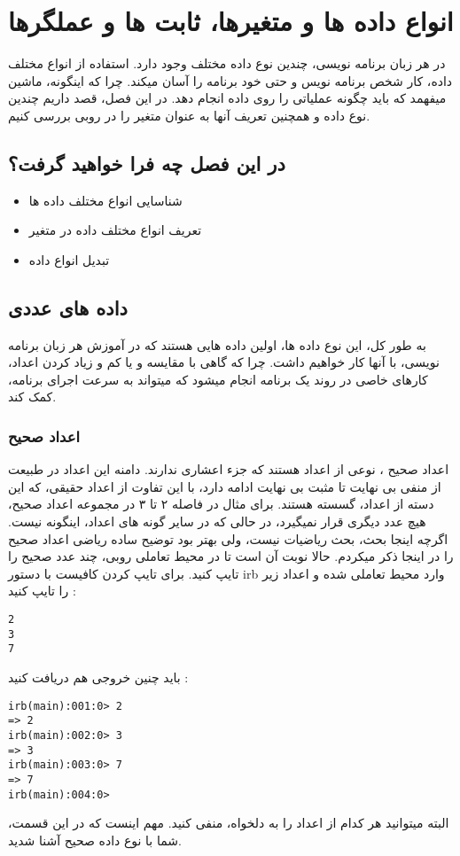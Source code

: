 \documentclass[11pt]{article}
\begin{document}
\section{انواع داده ها و متغیرها، ثابت ها و عملگرها}
در هر زبان برنامه نویسی، چندین نوع داده مختلف وجود دارد. استفاده از انواع مختلف داده، کار شخص برنامه نویس و حتی خود برنامه را آسان میکند. چرا که اینگونه، ماشین میفهمد که باید چگونه عملیاتی را روی داده انجام دهد. در این فصل، قصد داریم چندین نوع داده و همچنین تعریف آنها به عنوان متغیر را در روبی بررسی کنیم. 
\subsection{در این فصل چه فرا خواهید گرفت؟}
\begin{itemize}
\item شناسایی انواع مختلف داده ها
\item تعریف انواع مختلف داده در متغیر
\item تبدیل انواع داده
\end{itemize}
\subsection{داده های عددی}
به طور کل، این نوع داده ها، اولین داده هایی هستند که در آموزش هر زبان برنامه نویسی، با آنها کار خواهیم داشت. چرا که گاهی با مقایسه و یا کم و زیاد کردن اعداد، کارهای خاصی در روند یک برنامه انجام میشود که میتواند به سرعت اجرای برنامه، کمک کند. 
\subsubsection{اعداد صحیح}
اعداد صحیح
، نوعی از اعداد هستند که جزء اعشاری ندارند. دامنه این اعداد در طبیعت از منفی بی نهایت تا مثبت بی نهایت ادامه دارد، با این تفاوت از اعداد حقیقی، که این دسته از اعداد، گسسته هستند. برای مثال در فاصله ۲ تا ۳ در مجموعه اعداد صحیح، هیچ عدد دیگری قرار نمیگیرد، در حالی که در سایر گونه های اعداد، اینگونه نیست. اگرچه اینجا بحث، بحث ریاضیات نیست، ولی بهتر بود توضیح ساده ریاضی اعداد صحیح را در اینجا ذکر میکردم. حالا نوبت آن است تا در محیط تعاملی روبی، چند عدد صحیح را تایپ کنید. برای تایپ کردن کافیست با دستور irb وارد محیط تعاملی شده و اعداد زیر را تایپ کنید :
\begin{latin}
\begin{verbatim}
2
3
7
\end{verbatim}
\end{latin}
باید چنین خروجی هم دریافت کنید :
\begin{latin}
\begin{verbatim}
irb(main):001:0> 2
=> 2
irb(main):002:0> 3
=> 3
irb(main):003:0> 7
=> 7
irb(main):004:0> 
\end{verbatim}
\end{latin}
البته میتوانید هر کدام از اعداد را به دلخواه، منفی کنید. مهم اینست که در این قسمت، شما با نوع داده صحیح آشنا شدید. 
\end{document}
